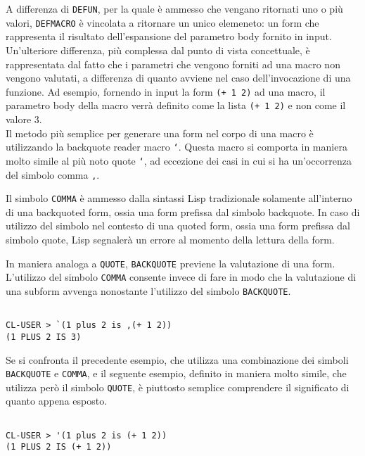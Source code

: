 A differenza di \texttt{DEFUN}, per la quale è ammesso che vengano ritornati
uno o più valori, \texttt{DEFMACRO} è vincolata a ritornare un unico
elemeneto: un form che rappresenta il risultato dell'espansione del parametro
body fornito in input. Un’ulteriore differenza, più complessa dal punto di
vista concettuale, è rappresentata dal fatto che i parametri che vengono
forniti ad una macro non vengono valutati, a differenza di quanto avviene nel
caso dell’invocazione di una funzione. Ad esempio, fornendo in input la form
\texttt{(+ 1 2)} ad una macro, il parametro body della macro verrà definito
come la lista \texttt{(+ 1 2)} e non come il valore 3.\\

Il metodo più semplice per generare una form nel corpo di una macro è
utilizzando la backquote reader macro \texttt{`}. Questa macro si comporta in
maniera molto simile al più noto quote \texttt{‘}, ad eccezione dei casi in
cui si ha un’occorrenza del simbolo comma \texttt{,}.

Il simbolo \texttt{COMMA} è ammesso dalla sintassi Lisp tradizionale solamente
all’interno di una backquoted form, ossia una form prefissa dal simbolo
backquote. In caso di utilizzo del simbolo nel contesto di una quoted form,
ossia una form prefissa dal simbolo quote, Lisp segnalerà un errore al momento
della lettura della form.

In maniera analoga a \texttt{QUOTE}, \texttt{BACKQUOTE} previene la
valutazione di una form. L’utilizzo del simbolo \texttt{COMMA} consente invece
di fare in modo che la valutazione di una subform avvenga nonostante
l’utilizzo del simbolo \texttt{BACKQUOTE}.

\begin{lstlisting}

CL-USER > `(1 plus 2 is ,(+ 1 2))
(1 PLUS 2 IS 3)

\end{lstlisting}

Se si confronta il precedente esempio, che utilizza una combinazione dei
simboli \texttt{BACKQUOTE} e \texttt{COMMA}, e il seguente esempio, definito
in maniera molto simile, che utilizza però il simbolo \texttt{QUOTE}, è
piuttosto semplice comprendere il significato di quanto appena esposto.

\begin{lstlisting}

CL-USER > '(1 plus 2 is (+ 1 2))
(1 PLUS 2 IS (+ 1 2))

\end{lstlisting}

